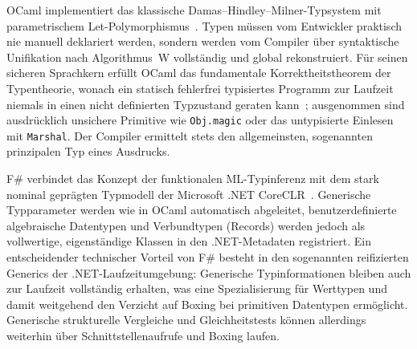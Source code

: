 OCaml implementiert das klassische Damas--Hindley--Milner-Typsystem mit parametrischem Let-Polymorphismus~\cite{milner1978theory}.
Typen müssen vom Entwickler praktisch nie manuell deklariert werden, sondern werden vom Compiler über syntaktische Unifikation nach Algorithmus~W vollständig und global rekonstruiert.
Für seinen sicheren Sprachkern erfüllt OCaml das fundamentale Korrektheitstheorem der Typentheorie, wonach ein statisch fehlerfrei typisiertes Programm zur Laufzeit niemals in einen nicht definierten Typzustand geraten kann~\cite{wright1994syntactic}; ausgenommen sind ausdrücklich unsichere Primitive wie \texttt{Obj.magic} oder das untypisierte Einlesen mit \texttt{Marshal}.
Der Compiler ermittelt stets den allgemeinsten, sogenannten prinzipalen Typ eines Ausdrucks.

F\# verbindet das Konzept der funktionalen ML-Typinferenz mit dem stark nominal geprägten Typmodell der Microsoft .NET CoreCLR~\cite{syme2020early}.
Generische Typparameter werden wie in OCaml automatisch abgeleitet, benutzerdefinierte algebraische Datentypen und Verbundtypen (Records) werden jedoch als vollwertige, eigenständige Klassen in den .NET-Metadaten registriert.
Ein entscheidender technischer Vorteil von F\# besteht in den sogenannten reifizierten Generics der .NET-Laufzeitumgebung: Generische Typinformationen bleiben auch zur Laufzeit vollständig erhalten, was eine Spezialisierung für Werttypen und damit weitgehend den Verzicht auf Boxing bei primitiven Datentypen ermöglicht.
Generische strukturelle Vergleiche und Gleichheitstests können allerdings weiterhin über Schnittstellenaufrufe und Boxing laufen.

